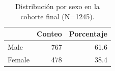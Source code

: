\begin{table}[H]
\centering
\begin{tabular}{lrr}
\toprule
 & Conteo & Porcentaje \\
\midrule
Male & 767 & 61.6 \\
Female & 478 & 38.4 \\
\bottomrule
\end{tabular}
\caption{Distribución por sexo en la cohorte final (N=1245).}
\label{tab:sex_dist}
\end{table}
